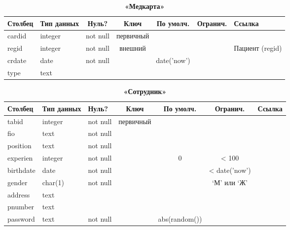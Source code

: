 \documentclass[14pt,a4paper,russian]{extreport}
\begin{document}
\begin{table}[h]
    \caption{ } 
    \begin{subtable}[t]{\textwidth}
        \caption{\textbf{«Медкарта»}}
    \begin{tabularx}{\textwidth}{| X | X | c | c | c | c | X |}
        \hline
        \textbf{Столбец} & \textbf{Тип данных} & \textbf{Нуль?} & \textbf{Ключ} & \textbf{По
        умолч.} & \textbf{Огранич.} & \textbf{Ссылка} \\ \hline
        cardid & integer & not null & первичный & & & \\ \hline
        regid & integer & not null & внешний & & & Пациент (regid) \\ \hline
        crdate & date & not null & & date('now') & & \\ \hline
        type & text & & & & & \\ \hline
    \end{tabularx}
    \end{subtable}
    \label{table:medcard}
\end{table}

\begin{table}[h]
    \caption{ } 
    \begin{subtable}[t]{\textwidth}
        \caption{\textbf{«Сотрудник»}}
    \begin{tabularx}{\textwidth}{| X | X | X | c | c | c | X |}
        \hline
        \textbf{Столбец} & \textbf{Тип данных} & \textbf{Нуль?} & \textbf{Ключ} & \textbf{По
        умолч.} & \textbf{Огранич.} & \textbf{Ссылка} \\ \hline
        tabid & integer & not null & первичный & & &  \\ \hline
        fio & text & not null & & & & \\ \hline
        position & text & not null & & & & \\ \hline
        experien & integer & not null & & 0 & < 100 & \\ \hline
        birthdate & date & not null & & & < date('now') & \\ \hline
        gender & char(1) & not null & & & `М' или `Ж' & \\ \hline
        address & text & & & & & \\ \hline
        pnumber & text & & & & & \\ \hline
        password & text & not null & & abs(random()) & & \\ \hline
    \end{tabularx}
    \end{subtable}
    \label{table:emp}
\end{table}
\end{document}
